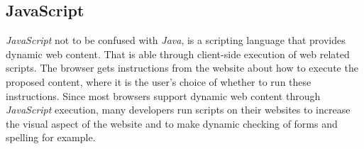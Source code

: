 \subsection{JavaScript}
\textit{JavaScript} not to be confused with \textit{Java}, is a scripting language that provides dynamic web content. That is able through client-side execution of web related scripts. The browser gets instructions from the website about how to execute the proposed content, where it is the user's choice of whether to run these instructions.
Since most browsers support dynamic web content through \textit{JavaScript} execution, many developers run scripts on their websites to increase the visual aspect of the website and to make dynamic checking of forms and spelling for example.\cite{javascript}
